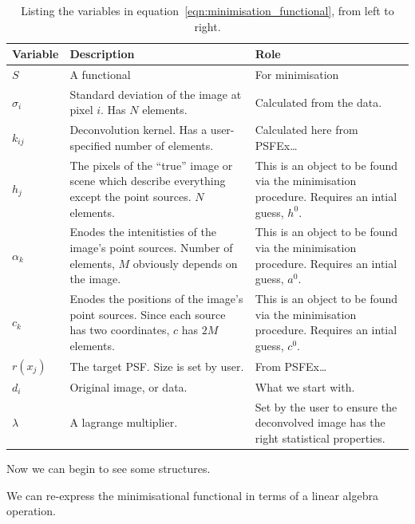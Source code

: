 \documentclass[letterpaper, 11pt]{article}
\begin{document}
\begin{center}
	\begin{table}[h!]
		\begin{tabularx}{\textwidth}{l | X | X}
			\hline
			Variable	& Description & Role\\ \hline
			$S$ 	& A functional & For minimisation\\ \hline
			$\sigma_i$ & Standard deviation of the image at pixel $i$. Has $N$ elements. & Calculated from the data.\\ \hline
			$k_{ij}$	& Deconvolution kernel. Has a user-specified number of elements. & Calculated here from PSFEx\ldots\\ \hline
			$h_j$		& The pixels of the ``true'' image or scene which describe everything except the point sources. $N$ elements. & This is an object to be found via the minimisation procedure. Requires an intial guess, $h^0$.\\ \hline
			$\alpha_k$	& Enodes the intenitisties of the image's point sources. Number of elements, $M$ obviously depends on the image. & This is an object to be found via the minimisation procedure. Requires an intial guess, $a^0$.\\ \hline
			$c_k$	& Enodes the positions of the image's point sources. Since each source has two coordinates, $c$ has $2M$ elements. & This is an object to be found via the minimisation procedure. Requires an intial guess, $c^0$.\\ \hline
			$r(x_j)$	& The target PSF. Size is set by user. & From PSFEx\ldots\\ \hline 
			$d_i$	& Original image, or data. & What we start with.\\ \hline
			$\lambda$	& A lagrange multiplier. & Set by the user to ensure the deconvolved image has the right statistical properties.\\
			\hline
		\end{tabularx}
		\caption{Listing the variables in equation~\ref{eqn:minimisation_functional}, from left to right.}
		\label{tbl:minimisation_functional}
	\end{table}
\end{center}

Now we can begin to see some structures.

We can re-express the minimisational functional in terms of a linear algebra operation.


\end{document}
